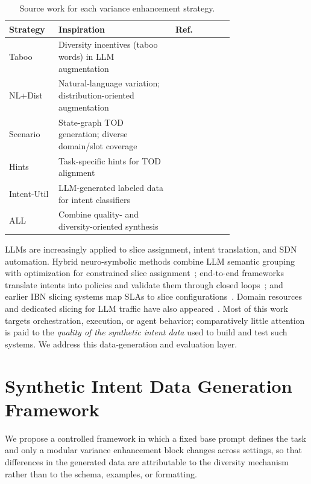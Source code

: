 \documentclass[conference]{IEEEtran}
\begin{document}
\begin{table}[t]
\centering
\small
\caption{Source work for each variance enhancement strategy.}
\label{tab:sources}
\begin{tabular}{p{0.22\linewidth} p{0.52\linewidth} l}
\toprule
\textbf{Strategy} & \textbf{Inspiration} & \textbf{Ref.} \\
\midrule
Taboo & Diversity incentives (taboo words) in LLM augmentation & \cite{cegin2024diversity} \\
NL+Dist & Natural-language variation; distribution-oriented augmentation & \cite{saparina2024nlvariation,wang2025doaug} \\
Scenario & State-graph TOD generation; diverse domain/slot coverage & \cite{samarinas2024syntod,finch2024diversedst} \\
Hints & Task-specific hints for TOD alignment & \cite{saley2024synctod} \\
Intent-Util & LLM-generated labeled data for intent classifiers & \cite{benayas2024intent} \\
ALL & Combine quality- and diversity-oriented synthesis & \cite{bao2025qualitydiversity} \\
\bottomrule
\end{tabular}
\end{table}

LLMs are increasingly applied to slice assignment, intent translation, and SDN automation. Hybrid neuro-symbolic methods combine LLM semantic grouping with optimization for constrained slice assignment~\cite{slice2025constrained}; end-to-end frameworks translate intents into policies and validate them through closed loops~\cite{e2e2025intent,hossain2025netintent}; and earlier IBN slicing systems map SLAs to slice configurations~\cite{ibnslicing2020}. Domain resources and dedicated slicing for LLM traffic have also appeared~\cite{tspecllm2025,llmslice2024}. Most of this work targets orchestration, execution, or agent behavior; comparatively little attention is paid to the \emph{quality of the synthetic intent data} used to build and test such systems. We address this data-generation and evaluation layer.

\section{Synthetic Intent Data Generation Framework}
\label{sec:datagen}

We propose a controlled framework in which a fixed base prompt defines the task and only a modular variance enhancement block changes across settings, so that differences in the generated data are attributable to the diversity mechanism rather than to the schema, examples, or formatting.
\end{document}
